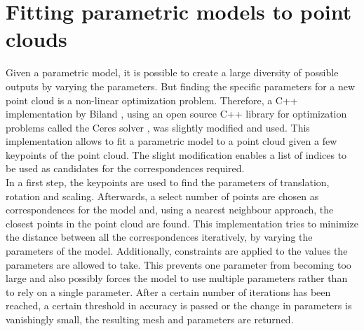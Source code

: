 \section{Fitting parametric models to point clouds}
\label{fitModel}
Given a parametric model, it is possible to create a large diversity of possible outputs by varying the parameters. But finding the specific parameters for a new point cloud is a non-linear optimization problem. Therefore, a C++ implementation by Biland \cite{Biland17}, using an open source C++ library for optimization problems called the Ceres solver \cite{ceres-solver}, was slightly modified and used. This implementation allows to fit a parametric model to a point cloud given a few keypoints of the point cloud. The slight modification enables a list of indices to be used as candidates for the correspondences required.\\
In a first step, the keypoints are used to find the parameters of translation, rotation and scaling. Afterwards, a select number of points are chosen as correspondences for the model and, using a nearest neighbour approach, the closest points in the point cloud are found. This implementation tries to minimize the distance between all the correspondences iteratively, by varying the parameters of the model. Additionally, constraints are applied to the values the parameters are allowed to take. This prevents one parameter from becoming too large and also possibly forces the model to use multiple parameters rather than to rely on a single parameter. After a certain number of iterations has been reached, a certain threshold in accuracy is passed or the change in parameters is vanishingly small, the resulting mesh and parameters are returned.
